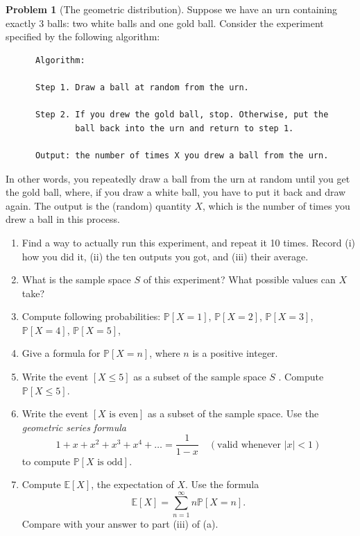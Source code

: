 \documentclass[10pt]{article}
\theoremstyle{definition}
\newtheorem{problem}[theorem]{Problem}
\newcommand{\1}[1]{\textbf{1}_{\left[#1\right]}} %
\def\E{\mathbb{E}} %
\def\P{\mathbb{P}} %
\begin{document}
\begin{problem}[The geometric distribution]
  \label{problem:geometric-experiment}
  Suppose we have an urn containing exactly $3$ balls: two white balls and one
  gold ball. Consider the experiment specified by the following algorithm:
\begin{verbatim}
      Algorithm:

      Step 1. Draw a ball at random from the urn.

      Step 2. If you drew the gold ball, stop. Otherwise, put the
              ball back into the urn and return to step 1.

      Output: the number of times X you drew a ball from the urn.
\end{verbatim}
  In other words, you repeatedly draw a ball from the urn at random until you
  get the gold ball, where, if you draw a white ball, you have to put it back
  and draw again. The output is the (random) quantity $X$, which is the number
  of times you drew a ball in this process.

  \begin{enumerate}[(a.)]
    \item Find a way to actually run this experiment, and repeat it 10 times.
    Record (i) how you did it, (ii) the ten outputs you got, and (iii) their
    average.
    
    \item What is the sample space $S$ of this experiment? What possible
    values can $X$ take?
    \item Compute following probabilities: $\P\left[X=1 \right]$,
    $\P\left[X=2 \right]$, $\P\left[X=3 \right]$, $\P\left[X=4 \right]$,
    $\P\left[X=5 \right]$,
    \item Give a formula for $\P\left[X=n \right]$, where $n$ is a positive
    integer.
    \item Write the event $\left[ X \leq 5\right]$ as a subset of the sample
    space $S$ . Compute
    $\P\left[X \leq 5\right]$.
    \item Write the event $\left[ X \text{ is even} \right]$ as a subset of the
    sample space. Use the \textit{geometric series formula}
    \begin{equation*}
      1+x+x^{2}+x^{3}+x^{4}+\ldots = \frac{1}{1-x} \quad (\text{valid whenever }|x|<1)
    \end{equation*}
    to compute $\P\left[X \text{ is odd} \right]$.
    
    \item Compute $\E\left[X \right]$, the expectation of $X$. Use the formula
    \begin{equation*}
      \E\left[X \right]= \sum_{n=1}^{\infty} n \P\left[X=n \right].
    \end{equation*}
    Compare with your answer to part (iii) of (a).
  \end{enumerate}
\end{problem}
\end{document}

